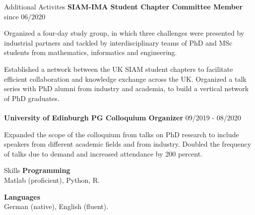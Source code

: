 \documentclass{resume} %
\begin{document}
\begin{rSection}{Additional Activites}
{\bf SIAM-IMA Student Chapter Committee Member} \hfill{since 06/2020}

Organized a four-day study group, in which three challenges were presented by industrial partners and tackled by interdisciplinary teams of PhD and MSc students from mathematics, informatics and engineering. 

Established a network between the UK SIAM student chapters to facilitate efficient collaboration and knowledge exchange across the UK. Organized a talk series with PhD alumni from industry and academia, to build a vertical network of PhD graduates. 
\\
\\
{\bf University of Edinburgh PG Colloquium Organizer} \hfill{09/2019 - 08/2020}

Expanded the scope of the colloquium from talks on PhD research to include speakers from different academic fields and from industry. Doubled the frequency of talks due to demand and increased attendance by 200 percent.
\end{rSection}

\begin{rSection}{Skills}
{\bf Programming}\\
Matlab (proficient), Python, R.

{\bf Languages}\\
German (native), English (fluent). 
\end{rSection}
\end{document}
